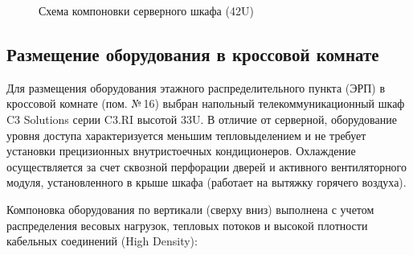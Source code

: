 \documentclass[a4paper,oneside,14pt]{extreport}
\begin{document}
\begin{figure}[H]
{
    }
    \caption{Схема компоновки серверного шкафа (42U)}
\end{figure}

\subsection{Размещение оборудования в кроссовой комнате}
Для размещения оборудования этажного распределительного пункта (ЭРП) в кроссовой комнате (пом. №\,16) выбран напольный телекоммуникационный шкаф C3 Solutions серии C3.RI высотой 33U. В отличие от серверной, оборудование уровня доступа характеризуется меньшим тепловыделением и не требует установки прецизионных внутристоечных кондиционеров. Охлаждение осуществляется за счет сквозной перфорации дверей и активного вентиляторного модуля, установленного в крыше шкафа (работает на вытяжку горячего воздуха).

Компоновка оборудования по вертикали (сверху вниз) выполнена с учетом распределения весовых нагрузок, тепловых потоков и высокой плотности кабельных соединений (High Density):
\end{document}

